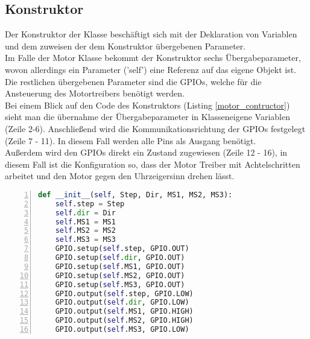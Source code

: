 \subsection{Konstruktor} 
Der Konstruktor der Klasse beschäftigt sich mit der Deklaration von Variablen und dem zuweisen der dem Konstruktor übergebenen Parameter.\\
Im Falle der Motor Klasse bekommt der Konstruktor sechs Übergabeparameter, wovon allerdings ein Parameter ('self') eine Referenz auf das eigene Objekt ist.\\
Die restlichen übergebenen Parameter sind die \acp{GPIO}, welche für die Ansteuerung des Motortreibers benötigt werden.\\
Bei einem Blick auf den Code des Konstruktors (Listing \ref{motor_contructor}) sieht man die übernahme der Übergabeparameter in Klasseneigene Variablen (Zeile 2-6). Anschließend wird die Kommunikationsrichtung der \acp{GPIO} festgelegt (Zeile 7 - 11). In diesem Fall werden alle Pins als Ausgang benötigt.\\
Außerdem wird den \acp{GPIO} direkt ein Zustand zugewiesen (Zeile 12 - 16), in diesem Fall ist die Konfiguration so, dass der Motor Treiber mit Achtelschritten arbeitet und den Motor gegen den  Uhrzeigersinn drehen lässt.
\begin{lstlisting}[caption={Konstruktor der Motor Klasse}, language={Python}, label={motor_contructor}, numbers=left]
def __init__(self, Step, Dir, MS1, MS2, MS3):
    self.step = Step
    self.dir = Dir
    self.MS1 = MS1
    self.MS2 = MS2
    self.MS3 = MS3
    GPIO.setup(self.step, GPIO.OUT)
    GPIO.setup(self.dir, GPIO.OUT)
    GPIO.setup(self.MS1, GPIO.OUT)
    GPIO.setup(self.MS2, GPIO.OUT)
    GPIO.setup(self.MS3, GPIO.OUT)
    GPIO.output(self.step, GPIO.LOW)
    GPIO.output(self.dir, GPIO.LOW)
    GPIO.output(self.MS1, GPIO.HIGH)
    GPIO.output(self.MS2, GPIO.HIGH)
    GPIO.output(self.MS3, GPIO.LOW)
\end{lstlisting}

